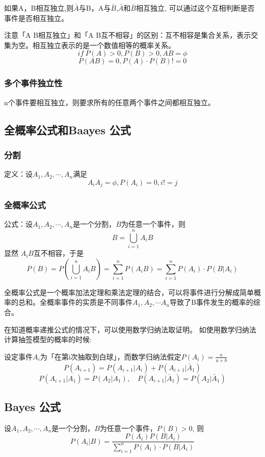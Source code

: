 \documentclass[10pt, a4paper]{article}
\begin{document}
                如果A，B相互独立,则$\bar{A}$与B，A与$\bar{B}$,$\bar{A}$和$\bar{B}$相互独立, 可以通过这个互相判断是否事件是否相互独立。

                注意「A B相互独立」和「A B互不相容」的区别：互不相容是集合关系，表示交集为空。相互独立表示的是一个数值相等的概率关系。
                    $$if\ P(A) > 0, P(B) > 0, AB = \phi$$
                    $$P(AB) = 0, P(A) \cdot P(B) != 0$$ 
                \subsubsection{多个事件独立性}
                    n个事件要相互独立，则要求所有的任意两个事件之间都相互独立。
    \subsection{全概率公式和Baayes 公式 }
        \subsubsection{分割}
            定义：设$A_1, A_2, \cdots, A_n$满足
            $$A_iA_j = \phi, P(A_i) = 0, i !=j $$
            $$$$

        \subsubsection{全概率公式}
            公式：设$A_1, A_2, \cdots, A_n$是一个分割，$B$为任意一个事件，则
                    $$B = \bigcup_{i = 1}^{n}A_iB$$
            显然 $A_iB$互不相容，于是
            $$P(B) = P(\bigcup_{i = 1}^{n}A_iB) = \sum_{i = 1}^{n}P(A_iB) = \sum_{i = 1}^{n}P(A_i)\cdot P(B|A_i)$$
            
            全概率公式是一个概率加法定理和乘法定理的结合，可以将事件进行分解成简单概率的总和。全概率事件的实质是不同事件$A_1, A_2, \cdots A_n$导致了B事件发生的概率的综合。
            
            在知道概率递推公式的情况下，可以使用数学归纳法取证明。 如使用数学归纳法计算抽签模型的概率的时候: 

            设定事件$A_i$为「在第i次抽取到白球」，而数学归纳法假定$P(A_i) = \frac{a}{a + b}$
            \begin{equation*}
                P(A_{i + 1}) = P(A_{i + 1}|A_i) + P(A_{i + 1}| \bar{A}_1)
            \end{equation*}
            $$P(A_{i + 1} | A_1) = P(A_2 | A_1),\quad P(A_{i + 1}|\bar{A}_1) = P(A_2|\bar{A}_1)$$
        \subsection{Bayes 公式}
            设$A_1, A_2, \cdots, A_n$是一个分割，$B$为任意一个事件，$P(B) > 0$, 则
            $$P(A_i|B) = \frac{P(A_i)P(B|A_i)}{\sum_{i = 1}^{n}P(A_i)\cdot P(B|A_i)}$$
\end{document}
